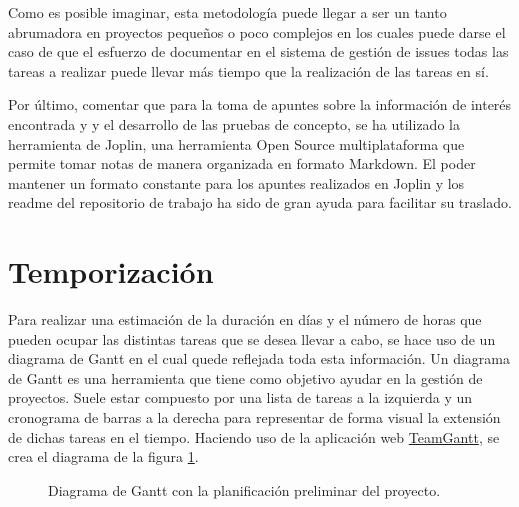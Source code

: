 Como es posible imaginar, esta metodología puede llegar a ser un tanto abrumadora en proyectos pequeños o poco 
complejos en los cuales puede darse el caso de que el esfuerzo de documentar en el sistema de gestión de issues 
todas las tareas a realizar puede llevar más tiempo que la realización de las tareas en sí.

Por último, comentar que para la toma de apuntes sobre la información de interés encontrada y y el desarrollo de 
las pruebas de concepto, se ha utilizado la herramienta de Joplin, una herramienta Open Source multiplataforma que 
permite tomar notas de manera organizada en formato Markdown. El poder mantener un formato constante para los apuntes
realizados en Joplin y los readme del repositorio de trabajo ha sido de gran ayuda para facilitar su traslado.

\section{Temporización}
Para realizar una estimación de la duración en días y el número de horas que pueden ocupar las distintas tareas que se desea 
llevar a cabo, se hace uso de un diagrama de Gantt en el cual quede reflejada toda esta información. Un diagrama de 
Gantt es una herramienta que tiene como objetivo ayudar en la gestión de proyectos. Suele estar compuesto por una lista 
de tareas a la izquierda y un cronograma de barras a la derecha para representar de forma visual la extensión de dichas 
tareas en el tiempo. Haciendo uso de la aplicación web \hyperlink{https://www.teamgantt.com/}{TeamGantt}, se crea el 
diagrama de la figura \ref{fig:gantt}.\bigskip
\begin{figure}[H]
    \caption{Diagrama de Gantt con la planificación preliminar del proyecto.}
    \label{fig:gantt}
\end{figure}

